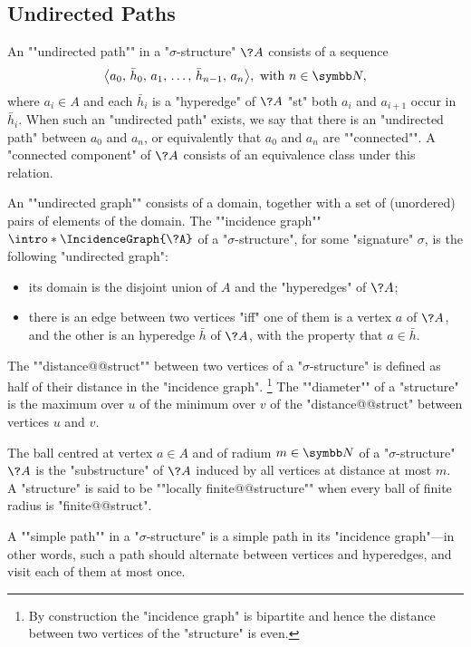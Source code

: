 \subsection{Undirected Paths}

An \AP""undirected path"" in a "$\sigma$-structure" $\?A$ consists of a sequence
\[\big\langle a_0,\, \bar h_0,\, a_1,\, \dotsc,\, \bar h_{n-1},\, a_n\big\rangle, \text{ with } n \in \N,\]
where $a_i \in A$ and each $\bar h_i$ is a "hyperedge" of $\?A$ "st" both
$a_i$ and $a_{i+1}$ occur in $\bar h_i$. When such an "undirected path" exists, we say that
there is an "undirected path" between $a_0$ and $a_n$, or equivalently
that $a_0$ and $a_n$ are \AP""connected"".%
A \AP"connected component" of $\?A$ consists of an equivalence class under this relation.

An ""undirected graph"" consists of a domain, together with
a set of (unordered) pairs of elements of the domain.
The ""incidence graph"" $\intro*\IncidenceGraph{\?A}$ of a "$\sigma$-structure",
for some "signature" $\sigma$, is the following "undirected graph":
\begin{itemize}
	\item its domain is the disjoint union of $A$
		and the "hyperedges" of $\?A$;
	\item there is an edge between two vertices "iff" one of them
		is a vertex $a$ of $\?A$, and the other is an hyperedge
		$\bar h$ of $\?A$, with the property that $a \in \bar h$.
\end{itemize}

The \AP""distance@@struct"" between two vertices of a "$\sigma$-structure"
is defined as half of their distance in the "incidence graph".%
\footnote{By construction the "incidence graph" is bipartite and hence
the distance between two vertices of the "structure" is even.}
The \AP""diameter"" of a "structure" is the maximum over $u$
of the minimum over $v$ of the "distance@@struct" between vertices $u$ and $v$.

The ball centred at vertex $a\in A$ and of radium $m\in\N$ of
a "$\sigma$-structure" $\?A$ is the "substructure" of $\?A$ induced by
all vertices at distance at most $m$.
A "structure" is said to be \AP""locally finite@@structure""
when every ball of finite radius is "finite@@struct".

A \AP""simple path"" in a "$\sigma$-structure" is a
simple path in its "incidence graph"---in other words, 
such a path should alternate between vertices and hyperedges,
and visit each of them at most once.

